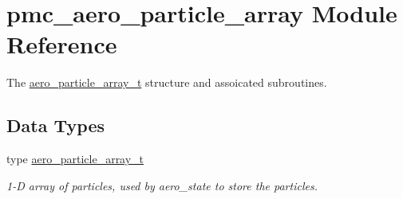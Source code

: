 \hypertarget{namespacepmc__aero__particle__array}{}\section{pmc\+\_\+aero\+\_\+particle\+\_\+array Module Reference}
\label{namespacepmc__aero__particle__array}


The \mbox{\hyperlink{structpmc__aero__particle__array_1_1aero__particle__array__t}{aero\+\_\+particle\+\_\+array\+\_\+t}} structure and assoicated subroutines.  


\subsection*{Data Types}
\begin{DoxyCompactItemize}
\item 
type \mbox{\hyperlink{structpmc__aero__particle__array_1_1aero__particle__array__t}{aero\+\_\+particle\+\_\+array\+\_\+t}}
\begin{DoxyCompactList}\small\item\em 1-\/D array of particles, used by aero\+\_\+state to store the particles. \end{DoxyCompactList}\end{DoxyCompactItemize}
